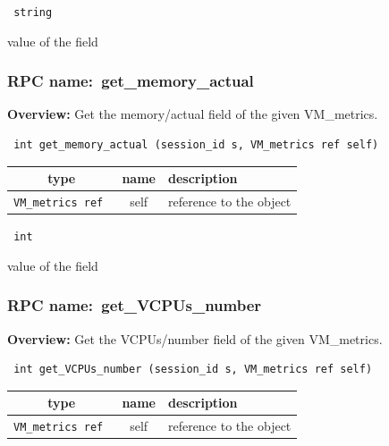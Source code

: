 \vspace{0.3cm}

{\tt 
string
}


value of the field
\vspace{0.3cm}
\vspace{0.3cm}
\vspace{0.3cm}
\subsubsection{RPC name:~get\_memory\_actual}

{\bf Overview:} 
Get the memory/actual field of the given VM\_metrics.

\begin{verbatim} int get_memory_actual (session_id s, VM_metrics ref self)\end{verbatim}



 
\vspace{0.3cm}
\begin{tabular}{|c|c|p{7cm}|}
 \hline
{\bf type} & {\bf name} & {\bf description} \\ \hline
{\tt VM\_metrics ref } & self & reference to the object \\ \hline 

\end{tabular}

\vspace{0.3cm}

{\tt 
int
}


value of the field
\vspace{0.3cm}
\vspace{0.3cm}
\vspace{0.3cm}
\subsubsection{RPC name:~get\_VCPUs\_number}

{\bf Overview:} 
Get the VCPUs/number field of the given VM\_metrics.

\begin{verbatim} int get_VCPUs_number (session_id s, VM_metrics ref self)\end{verbatim}



 
\vspace{0.3cm}
\begin{tabular}{|c|c|p{7cm}|}
 \hline
{\bf type} & {\bf name} & {\bf description} \\ \hline
{\tt VM\_metrics ref } & self & reference to the object \\ \hline 

\end{tabular}

